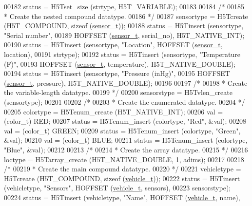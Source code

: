 \begin{DoxyCode}
00182     status = H5Tset\_size (strtype, H5T\_VARIABLE);
00183 
00184     \textcolor{comment}{/*}
00185 \textcolor{comment}{     * Create the nested compound datatype.}
00186 \textcolor{comment}{     */}
00187     sensortype = H5Tcreate (H5T\_COMPOUND, \textcolor{keyword}{sizeof} (\hyperlink{structsensor__t}{sensor\_t}));
00188     status = H5Tinsert (sensortype, \textcolor{stringliteral}{"Serial number"},
00189                 HOFFSET (\hyperlink{structsensor__t}{sensor\_t}, serial\_no), H5T\_NATIVE\_INT);
00190     status = H5Tinsert (sensortype, \textcolor{stringliteral}{"Location"}, HOFFSET (\hyperlink{structsensor__t}{sensor\_t}, location),
00191                 strtype);
00192     status = H5Tinsert (sensortype, \textcolor{stringliteral}{"Temperature (F)"},
00193                 HOFFSET (\hyperlink{structsensor__t}{sensor\_t}, temperature), H5T\_NATIVE\_DOUBLE);
00194     status = H5Tinsert (sensortype, \textcolor{stringliteral}{"Pressure (inHg)"},
00195                 HOFFSET (\hyperlink{structsensor__t}{sensor\_t}, pressure), H5T\_NATIVE\_DOUBLE);
00196 
00197     \textcolor{comment}{/*}
00198 \textcolor{comment}{     * Create the variable-length datatype.}
00199 \textcolor{comment}{     */}
00200     sensorstype = H5Tvlen\_create (sensortype);
00201 
00202     \textcolor{comment}{/*}
00203 \textcolor{comment}{     * Create the enumerated datatype.}
00204 \textcolor{comment}{     */}
00205     colortype = H5Tenum\_create (H5T\_NATIVE\_INT);
00206     val = (color\_t) RED;
00207     status = H5Tenum\_insert (colortype, \textcolor{stringliteral}{"Red"}, &val);
00208     val = (color\_t) GREEN;
00209     status = H5Tenum\_insert (colortype, \textcolor{stringliteral}{"Green"}, &val);
00210     val = (color\_t) BLUE;
00211     status = H5Tenum\_insert (colortype, \textcolor{stringliteral}{"Blue"}, &val);
00212 
00213     \textcolor{comment}{/*}
00214 \textcolor{comment}{     * Create the array datatype.}
00215 \textcolor{comment}{     */}
00216     loctype = H5Tarray\_create (H5T\_NATIVE\_DOUBLE, 1, adims);
00217 
00218     \textcolor{comment}{/*}
00219 \textcolor{comment}{     * Create the main compound datatype.}
00220 \textcolor{comment}{     */}
00221     vehicletype = H5Tcreate (H5T\_COMPOUND, \textcolor{keyword}{sizeof} (\hyperlink{structvehicle__t}{vehicle\_t}));
00222     status = H5Tinsert (vehicletype, \textcolor{stringliteral}{"Sensors"}, HOFFSET (\hyperlink{structvehicle__t}{vehicle\_t}, sensors),
00223                 sensorstype);
00224     status = H5Tinsert (vehicletype, \textcolor{stringliteral}{"Name"}, HOFFSET (\hyperlink{structvehicle__t}{vehicle\_t}, name),

\end{DoxyCode}
